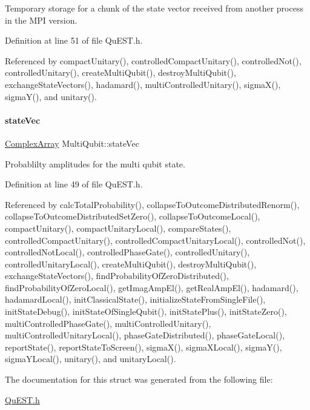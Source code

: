 Temporary storage for a chunk of the state vector received from another process in the M\+PI version. 



Definition at line 51 of file Qu\+E\+S\+T.\+h.



Referenced by compact\+Unitary(), controlled\+Compact\+Unitary(), controlled\+Not(), controlled\+Unitary(), create\+Multi\+Qubit(), destroy\+Multi\+Qubit(), exchange\+State\+Vectors(), hadamard(), multi\+Controlled\+Unitary(), sigma\+X(), sigma\+Y(), and unitary().

\mbox{\label{structMultiQubit_a45483190d6b01ef6b2f98f2bec9ab94f}} 
\paragraph{\texorpdfstring{state\+Vec}{stateVec}}
{\footnotesize\ttfamily \mbox{\hyperlink{structComplexArray}{Complex\+Array}} Multi\+Qubit\+::state\+Vec}



Probablilty amplitudes for the multi qubit state. 



Definition at line 49 of file Qu\+E\+S\+T.\+h.



Referenced by calc\+Total\+Probability(), collapse\+To\+Outcome\+Distributed\+Renorm(), collapse\+To\+Outcome\+Distributed\+Set\+Zero(), collapse\+To\+Outcome\+Local(), compact\+Unitary(), compact\+Unitary\+Local(), compare\+States(), controlled\+Compact\+Unitary(), controlled\+Compact\+Unitary\+Local(), controlled\+Not(), controlled\+Not\+Local(), controlled\+Phase\+Gate(), controlled\+Unitary(), controlled\+Unitary\+Local(), create\+Multi\+Qubit(), destroy\+Multi\+Qubit(), exchange\+State\+Vectors(), find\+Probability\+Of\+Zero\+Distributed(), find\+Probability\+Of\+Zero\+Local(), get\+Imag\+Amp\+El(), get\+Real\+Amp\+El(), hadamard(), hadamard\+Local(), init\+Classical\+State(), initialize\+State\+From\+Single\+File(), init\+State\+Debug(), init\+State\+Of\+Single\+Qubit(), init\+State\+Plus(), init\+State\+Zero(), multi\+Controlled\+Phase\+Gate(), multi\+Controlled\+Unitary(), multi\+Controlled\+Unitary\+Local(), phase\+Gate\+Distributed(), phase\+Gate\+Local(), report\+State(), report\+State\+To\+Screen(), sigma\+X(), sigma\+X\+Local(), sigma\+Y(), sigma\+Y\+Local(), unitary(), and unitary\+Local().



The documentation for this struct was generated from the following file\+:\begin{DoxyCompactItemize}
\item 
\mbox{\hyperlink{QuEST_8h}{Qu\+E\+S\+T.\+h}}\end{DoxyCompactItemize}
